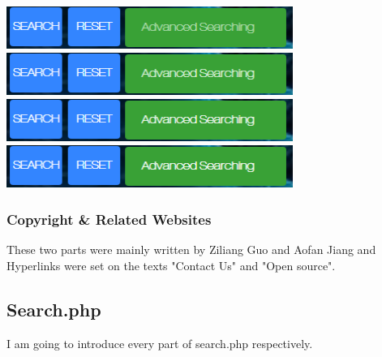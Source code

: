 \documentclass[10pt,twoside,a4paper,titlepage]{article}
\begin{document}
	\newline	
	\includegraphics[width=0.7\textwidth]{cyf/Advanced_searching28.png}
	\newline	
	\includegraphics[width=0.7\textwidth]{cyf/Advanced_searching29.png}
	\newline	
	\includegraphics[width=0.7\textwidth]{cyf/Advanced_searching30.png}
	\newline	
	\includegraphics[width=0.7\textwidth]{cyf/Advanced_searching31.png}
	
	\subsubsection{Copyright \& Related Websites}
	
	These two parts were mainly written by Ziliang Guo and Aofan Jiang and Hyperlinks were set on the texts "Contact Us" and "Open source".
	
	\subsection{Search.php}
	
	I am going to introduce every part of search.php respectively.
	\newline
	
\end{document}
